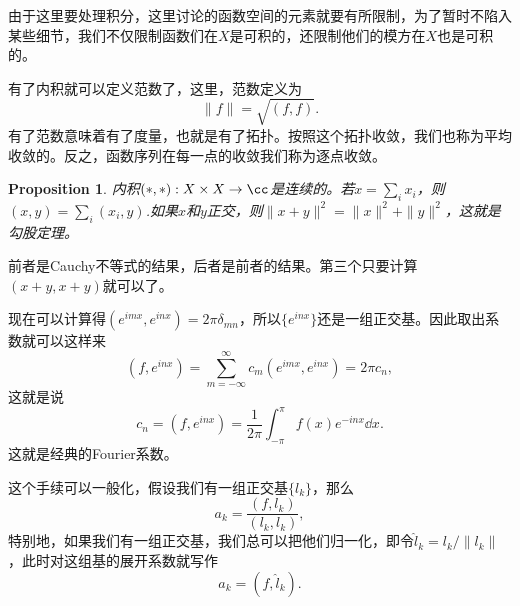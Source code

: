 \documentclass[10pt]{book}
\theoremstyle{plain}%
\newtheorem{pro}{Proposition}[chapter]%
\begin{document}
由于这里要处理积分，这里讨论的函数空间的元素就要有所限制，为了暂时不陷入某些细节，我们不仅限制函数们在$X$是可积的，还限制他们的模方在$X$也是可积的。

有了内积就可以定义范数了，这里，范数定义为
\[
	\|f\|=\sqrt{(f,f)}.
\]
有了范数意味着有了度量，也就是有了拓扑。按照这个拓扑收敛，我们也称为平均收敛的。反之，函数序列在每一点的收敛我们称为逐点收敛。
\begin{pro}
内积$(*,*):X\times X\to \cc$是连续的。若$x=\sum_i x_i$，则$(x,y)=\sum_i (x_i,y)$.如果$x$和$y$正交，则$\|x+y\|^2=\|x\|^2+\|y\|^2$，这就是勾股定理。
\end{pro}
前者是Cauchy不等式的结果，后者是前者的结果。第三个只要计算$(x+y,x+y)$就可以了。

现在可以计算得$(e^{imx},e^{inx})=2\pi\delta_{mn}$，所以$\{e^{inx}\}$还是一组正交基。因此取出系数就可以这样来
\[
	(f,e^{inx})=\sum_{m=-\infty}^\infty c_m(e^{imx},e^{inx})=2\pi c_n,
\]
这就是说
\[
	c_n=(f,e^{inx})=\frac{1}{2\pi}\int_{-\pi}^\pi f(x)e^{-inx}\dd x.
\]
这就是经典的Fourier系数。

这个手续可以一般化，假设我们有一组正交基$\{l_k\}$，那么
\[
	a_k=\frac{(f,l_k)}{(l_k,l_k)},
\]
特别地，如果我们有一组正交基，我们总可以把他们归一化，即令$\hat{l}_k=l_k/\|l_k\|$，此时对这组基的展开系数就写作
\[
	a_k=(f,\hat{l}_k).
\]
\end{document}
